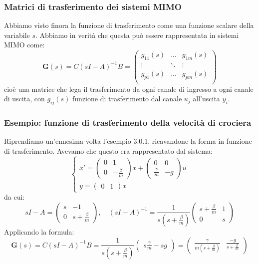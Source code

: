 \documentclass[a4paper,11pt]{article}
\begin{document}
\subsubsection{Matrici di trasferimento dei sistemi MIMO}
Abbiamo visto finora la funzione di trasferimento come una funzione scalare della variabile $s$.
Abbiamo in verità che questa può essere rappresentata in sistemi MIMO come:
$$
\mathbf{G}(s) = C (sI - A)^{-1} B =
\begin{pmatrix}
	g_{11}(s) & ... & g_{1m}(s) \\
	\vdots & \ddots & \vdots \\ 
	g_{p1}(s) & ... & g_{pm}(s) \\
\end{pmatrix}
$$
cioè una matrice che lega il trasferimento da ogni canale di ingresso a ogni canale di uscita, con $g_{ij}(s)$ funzione di trasferimento dal canale $u_j$ all'uscita $y_i$.

\subsubsection{Esempio: funzione di trasferimento della velocità di crociera}
Riprendiamo un'ennesima volta l'esempio 3.0.1, ricavandone la forma in funzione di trasferimento.
Avevamo che questo era rappresentato dal sistema:
\[
	\begin{cases}
		x' = \begin{pmatrix}
			0 & 1 \\ 0 & -\frac{\beta}{m}
		\end{pmatrix}	
		x + \begin{pmatrix}
			0 & 0 \\ \frac{\gamma}{m} & - g
		\end{pmatrix}
		u \\
		y = \begin{pmatrix}
			0 & 1
		\end{pmatrix}
		x
	\end{cases}
\]
da cui:
$$
sI - A = \begin{pmatrix}
	s & -1 \\
	0 & s + \frac{\beta}{m}
\end{pmatrix}, \quad
(sI - A)^{-1} =
\frac{1}{s\left( s + \frac{\beta}{m} \right)}
\begin{pmatrix}
	s + \frac{\beta}{m} & 1 \\
	0 & s
\end{pmatrix}
$$
Applicando la formula:
$$
\mathbf{G}(s) = C(sI - A)^{-1} B = \frac{1}{s\left(s + \frac{\beta}{m}\right)}
\begin{pmatrix}
	s \frac{\gamma}{m} - sg
\end{pmatrix}
= \begin{pmatrix}
	\frac{\gamma}{m \left( s + \frac{\beta}{m} \right)} &
	\frac{-g}{s + \frac{\beta}{m}}
\end{pmatrix}
$$
\end{document}
